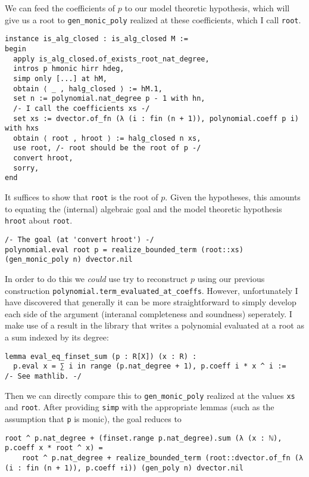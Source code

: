 We can feed the coefficients of $p$ to our model theoretic hypothesis,
which will give us a root to \texttt{gen\_monic\_poly}
realized at these coefficients, which I call \texttt{root}.

\begin{lstlisting}
instance is_alg_closed : is_alg_closed M :=
begin
  apply is_alg_closed.of_exists_root_nat_degree,
  intros p hmonic hirr hdeg,
  simp only [...] at hM,
  obtain ⟨ _ , halg_closed ⟩ := hM.1,
  set n := polynomial.nat_degree p - 1 with hn,
  /- I call the coefficients xs -/
  set xs := dvector.of_fn (λ (i : fin (n + 1)), polynomial.coeff p i) with hxs
  obtain ⟨ root , hroot ⟩ := halg_closed n xs,
  use root, /- root should be the root of p -/
  convert hroot,
  sorry,
end
\end{lstlisting}

It suffices to show that \texttt{root} is the root of $p$.
Given the hypotheses, this amounts to equating the (internal) algebraic goal
and the model theoretic hypothesis \texttt{hroot} about \texttt{root}.

\begin{lstlisting}
/- The goal (at 'convert hroot') -/
polynomial.eval root p = realize_bounded_term (root::xs) (gen_monic_poly n) dvector.nil\end{lstlisting}

In order to do this we \textit{could} use try to reconstruct $p$
using our previous construction \texttt{polynomial.term\_evaluated\_at\_coeffs}.
However, unfortunately I have discovered that generally it can be
more straightforward to simply develop each side of the argument
(interanal completeness and soundness) seperately.
I make use of a result in the library that writes a polynomial
evaluated at a root as a sum indexed by its degree:

\begin{lstlisting}
lemma eval_eq_finset_sum (p : R[X]) (x : R) :
  p.eval x = ∑ i in range (p.nat_degree + 1), p.coeff i * x ^ i :=
/- See mathlib. -/
\end{lstlisting}

Then we can directly compare this to \texttt{gen\_monic\_poly} realized
at the values \texttt{xs} and \texttt{root}.
After providing \texttt{simp} with the appropriate lemmas
(such as the assumption that \texttt{p} is monic),
the goal reduces to

\begin{lstlisting}
root ^ p.nat_degree + (finset.range p.nat_degree).sum (λ (x : ℕ), p.coeff x * root ^ x) =
    root ^ p.nat_degree + realize_bounded_term (root::dvector.of_fn (λ (i : fin (n + 1)), p.coeff ↑i)) (gen_poly n) dvector.nil\end{lstlisting}

